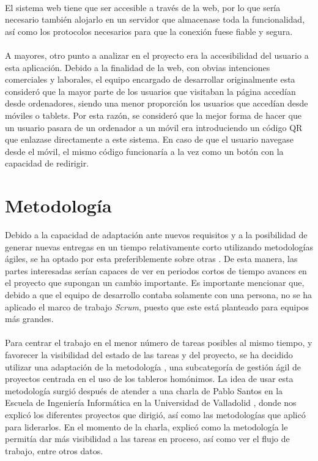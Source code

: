 \documentclass{subfiles}
\begin{document}
        \paragraph{}
        {El sistema web tiene que ser accesible a través de la web, por lo que sería necesario también alojarlo en un servidor que almacenase toda la funcionalidad, así como los protocolos necesarios para que la conexión fuese fiable y segura.}

        \paragraph{}
        {A mayores, otro punto a analizar en el proyecto era la accesibilidad del usuario a esta aplicación. Debido a la finalidad de la web, con obvias intenciones comerciales y laborales, el equipo encargado de desarrollar originalmente esta consideró que la mayor parte de los usuarios que visitaban la página accedían desde ordenadores, siendo una menor proporción los usuarios que accedían desde móviles o tablets. Por esta razón, se consideró que la mejor forma de hacer que un usuario pasara de un ordenador a un móvil era introduciendo un código QR que enlazase directamente a este sistema. En caso de que el usuario navegase desde el móvil, el mismo código funcionaría a la vez como un botón con la capacidad de redirigir.}


        \section{Metodología}
        \label{sec:1.3}
        
        {Debido a la capacidad de adaptación ante nuevos requisitos y a la posibilidad de generar nuevas entregas en un tiempo relativamente corto utilizando metodologías ágiles, se ha optado por esta preferiblemente sobre otras \cite{agilewebsite}. De esta manera, las partes interesadas serían capaces de ver en periodos cortos de tiempo avances en el proyecto que supongan un cambio importante. Es importante mencionar que, debido a que el equipo de desarrollo contaba solamente con una persona, no se ha aplicado el marco de trabajo \textit{Scrum}, puesto que este está planteado para equipos más grandes.}
        
        \paragraph{}
        {Para centrar el trabajo en el menor número de tareas posibles al mismo tiempo, y favorecer la visibilidad del estado de las tareas y del proyecto, se ha decidido utilizar una adaptación de la metodología \Kanban\cite{web:kanban}, una subcategoría de gestión ágil de proyectos centrada en el uso de los tableros homónimos. La idea de usar esta metodología surgió después de atender a una charla de Pablo Santos en la Escuela de Ingeniería Informática en la Universidad de Valladolid \cite{web:pablosantos}, donde nos explicó los diferentes proyectos que dirigió, así como las metodologías que aplicó para liderarlos. En el momento de la charla, explicó como la metodología \Kanban le permitía dar más visibilidad a las tareas en proceso, así como ver el flujo de trabajo, entre otros datos.}
\end{document}
